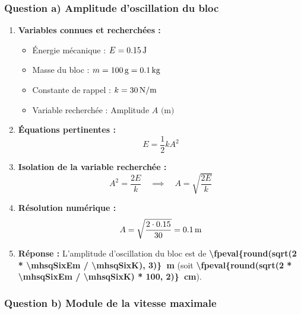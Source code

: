 \subsubsection*{Question a) Amplitude d'oscillation du bloc}

\begin{enumerate}[label=\arabic*)]
    \item \textbf{Variables connues et recherchées :}
    \begin{itemize}[label= -]
        \item Énergie mécanique : $E = \qty{0.15}{J}$
        \item Masse du bloc : $m = \qty{\mhsqSixMasse}{g} = \qty{\fpeval{\mhsqSixMasse / 1000}}{kg}$
        \item Constante de rappel : $k = \qty{30}{N/m}$
        \item Variable recherchée : Amplitude $A \text{ (m)}$
    \end{itemize}

    \item \textbf{Équations pertinentes :}
    \[
    E = \frac{1}{2} k A^2
    \]

    \item \textbf{Isolation de la variable recherchée :}
    \[
    A^2 = \frac{2E}{k} \quad \implies \quad A = \sqrt{\frac{2E}{k}}
    \]

    \item \textbf{Résolution numérique :}
    \[
    A = \sqrt{\frac{2 \cdot \mhsqSixEm}{\mhsqSixK}} = \qty{\fpeval{round(sqrt(2 * \mhsqSixEm / \mhsqSixK), 4)}}{m}
    \]

    \item \textbf{Réponse :}
    L'amplitude d'oscillation du bloc est de \textbf{\qty{\fpeval{round(sqrt(2 * \mhsqSixEm / \mhsqSixK), 3)}}{m}} (soit \textbf{\qty{\fpeval{round(sqrt(2 * \mhsqSixEm / \mhsqSixK) * 100, 2)}}{cm}}).
\end{enumerate}


\subsubsection*{Question b) Module de la vitesse maximale}

